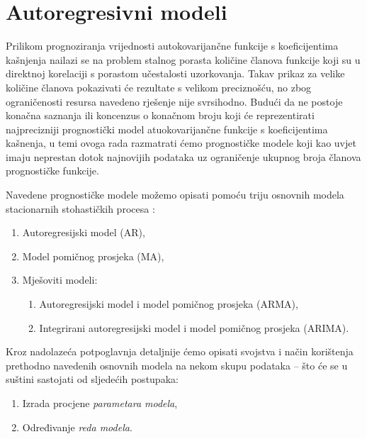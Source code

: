 \documentclass[a4paper,12pt,oneside]{memoir}
\begin{document}
    \chapter{Autoregresivni modeli}
            
        Prilikom prognoziranja vrijednosti autokovarijančne funkcije s koeficijentima kašnjenja nailazi se na problem stalnog porasta količine članova funkcije koji su u direktnoj korelaciji s porastom učestalosti uzorkovanja. Takav prikaz za velike količine članova pokazivati će rezultate s velikom preciznošću, no zbog ograničenosti resursa navedeno rješenje nije svrsihodno. Budući da ne postoje konačna saznanja ili koncenzus o konačnom broju koji će reprezentirati najprecizniji prognostički model atuokovarijančne funkcije s koeficijentima kašnenja, u temi ovoga rada razmatrati ćemo prognostičke modele koji kao uvjet imaju neprestan dotok najnovijih podataka uz ograničenje ukupnog broja članova prognostičke funkcije.

        Navedene prognostičke modele možemo opisati pomoću triju osnovnih modela stacionarnih stohastičkih procesa \cite{Broersen}:
        
        \begin{enumerate}
            \item Autoregresijski model (AR),
            \item Model pomičnog prosjeka (MA),
            \item Mješoviti modeli:
            \begin{enumerate}
                \item Autoregresijski model i model pomičnog prosjeka (ARMA),
                \item Integrirani autoregresijski model i model pomičnog prosjeka (ARIMA).
            \end{enumerate}
        \end{enumerate}
        
        Kroz nadolazeća potpoglavnja detaljnije ćemo opisati svojstva i način korištenja prethodno navedenih osnovnih modela na nekom skupu podataka -- što će se u suštini sastojati od sljedećih postupaka:
        
        \begin{enumerate}
            \item Izrada procjene \textit{parametara modela},
            \item Određivanje \textit{reda modela}.
        \end{enumerate}
\end{document}
